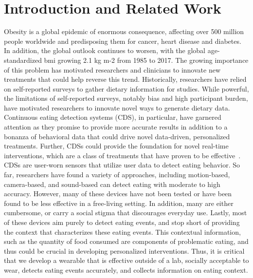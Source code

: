 \documentclass[conference]{IEEEtran}
\begin{document}
\section{Introduction and Related Work}
Obesity is a global epidemic of enormous consequence, affecting over 500 million people worldwide and predisposing them for cancer, heart disease and diabetes. In addition, the global outlook continues to worsen, with the global age-standardized bmi growing 2.1 kg m-2 from 1985 to 2017\cite{NCD_Risk_Factor_Collaboration_NCD-RisC2019-ii,Swinburn2011-xh}. The growing importance of this problem has motivated researchers and clinicians to innovate new treatments that could help reverse this trend. Historically, researchers have relied on self-reported surveys to gather dietary information for studies. While powerful, the limitations of self-reported surveys, notably bias and high participant burden, have motivated researchers to innovate novel ways to generate dietary data\cite{Zhang2017-xc}. Continuous eating detection systems (CDS), in particular, have garnered attention as they promise to provide more accurate results in addition to a bonanza of behavioral data that could drive novel data-driven, personalized treatments. Further, CDSs could provide the foundation for novel real-time interventions, which are a class of treatments that have proven to be effective~\cite{Coons2012-yz}.
CDSs are user-worn sensors that utilize user data to detect eating behavior. So far, researchers have found a variety of approaches, including motion-based, camera-based, and sound-based can detect eating with moderate to high accuracy\cite{Bi2018-pd,Dong2012-fh,Gao2016-dv,Rahman2015-sa}. However, many of these devices have not been tested or have been found to be less effective in a free-living setting. In addition, many are either cumbersome, or carry a social stigma that discourages everyday use\cite{Zhang2019-lq}. Lastly, most of these devices aim purely to detect eating events, and stop short of providing the context that characterizes these eating events. This contextual information, such as the quantity of food consumed are components of problematic eating, and thus could be crucial in developing personalized interventions. Thus, it is critical that we develop a wearable that is effective outside of a lab, socially acceptable to wear, detects eating events accurately, and collects information on eating context.
\end{document}
